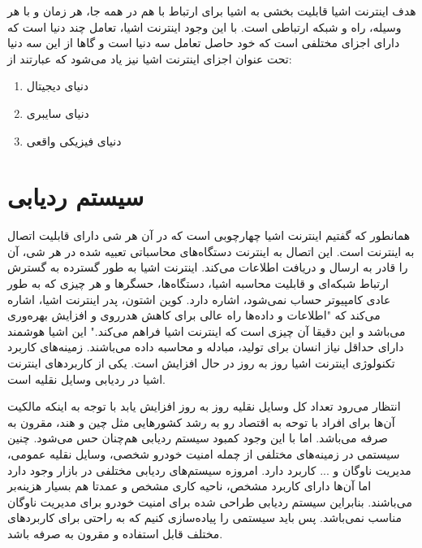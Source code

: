 هدف اینترنت اشیا قابلیت‌ بخشی به اشیا برای ارتباط با هم در همه جا، هر زمان و با هر وسیله،
راه و شبكه‌ ارتباطی است. با این وجود اینترنت اشیا، تعامل چند دنیا است که دارای اجزای مختلفی است که خود حاصل تعامل سه دنیا است و گاها از این سه دنیا تحت عنوان اجزای اینترنت اشیا نیز یاد می‌شود که عبارتند از:
\begin{enumerate}
	\item دنیای دیجیتال
	\item دنیای سایبری
	\item دنیای فیزیکی واقعی
\end{enumerate}
\section{سیستم ردیابی}
همانطور که گفتیم اینترنت اشیا چهارچوبی است که در آن هر شی دارای قابلیت اتصال به اینترنت است. 
	این اتصال به اینترنت دستگاه‌های محاسباتی تعبیه شده در هر شی، آن را قادر به ارسال و دریافت اطلاعات می‌کند. اینترنت اشیا به طور گسترده به گسترش ارتباط شبکه‌ای و قابلیت محاسبه اشیا، دستگاه‌ها، حسگرها و هر چیزی که به طور عادی کامپیوتر حساب نمی‌شود، اشاره دارد. کوین اشتون، پدر اینترنت اشیا، اشاره می‌کند که "اطلاعات و داده‌ها راه عالی برای کاهش هدرروی و افزایش بهره‌وری می‌باشد و این دقیقا آن چیزی است که اینترنت اشیا فراهم می‌کند." این اشیا هوشمند دارای حداقل نیاز انسان برای تولید، مبادله و محاسبه داده می‌باشند. زمینه‌های کاربرد تکنولوژی اینترنت اشیا روز به روز در حال افزایش است. یکی از کاربردهای اینترنت اشیا در ردیابی وسایل نقلیه است.\cite{Mangla2017, Mukhtar2015}
	
انتظار می‌رود تعداد کل وسایل نقلیه روز به روز افزایش یابد با توجه به اینکه مالکیت آن‌ها برای افراد با توحه به اقتصاد رو به رشد کشورهایی مثل چین و هند، مقرون به صرفه می‌باشد. اما با این وجود کمبود سیستم ردیابی هم‌چنان حس می‌شود. چنین سیستمی در زمینه‌های مختلفی از چمله امنیت خودرو شخصی، وسایل نقلیه عمومی، مدیریت ناوگان و ... کاربرد دارد. \cite{Pham2013} امروزه سیستم‌های ردیابی مختلفی در بازار وجود دارد اما آن‌ها دارای کاربرد مشخص، ناحیه کاری مشخص و عمدتا هم بسیار هزینه‌بر می‌باشند.\cite{YoujingCui2003} بنابراین سیستم ردیابی طراحی شده برای امنیت خودرو برای مدیریت ناوگان مناسب نمی‌باشد. \cite{Song2008} پس باید سیستمی را پیاده‌سازی کنیم که به راحتی برای کاربردهای مختلف قابل استفاده و مقرون به صرفه باشد.


